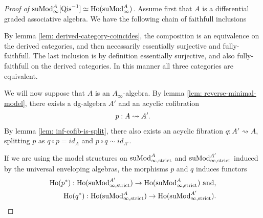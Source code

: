 \documentclass[../thesis.tex]{subfiles}
\begin{document}
            \begin{proof}[Proof of $\tt{suMod}_\infty^A{[\tt{Qis}^{-1}]} \simeq \tt{Ho}(\tt{suMod}_\infty^A)$]
               Assume first that $A$ is a differential graded associative algebra. We have the following chain of faithfull inclusions
                \begin{center}
                \end{center}
                 By lemma \ref{lem: derived-category-coincides}, the composition is an equivalence on the derived categories, and then necessarily essentially surjective and fully-faithfull. The last inclusion is by definition essentially surjective, and also fully-faithfull on the derived categories. In this manner all three categories are equivalent.

                 We will now suppose that $A$ is an $A_\infty$-algebra. By lemma \ref{lem: reverse-minimal-model}, there exists a dg-algebra $A'$ and an acyclic cofibration
                 \begin{align*}
                    p: A \rightsquigarrow A'\tt{.}
                 \end{align*}
                 By lemma \ref{lem: inf-cofib-is-split}, there also exists an acyclic fibration $q : A' \rightsquigarrow A$, splitting $p$ as $q \circ p = id_A$ and $p \circ q \sim id_{A'}$. 

                 If we are using the model structures on $\tt{suMod}_{\infty,\tt{strict}}^A$ and $\tt{suMod}_{\infty,\tt{strict}}^{A'}$ induced by the universal enveloping algebras, the morphisms $p$ and $q$ induces functors
                 \begin{align*}
                    \tt{Ho}(p^*) : \tt{Ho}(\tt{suMod}_{\infty,\tt{strict}}^{A'}) \rightarrow \tt{Ho}(\tt{suMod}_{\infty,\tt{strict}}^A)\tt{ and,}\\
                    \tt{Ho}(q^*) : \tt{Ho}(\tt{suMod}_{\infty,\tt{strict}}^A) \rightarrow \tt{Ho}(\tt{suMod}_{\infty,\tt{strict}}^{A'})\tt{.}
                 \end{align*}


\end{proof}
\end{document}
